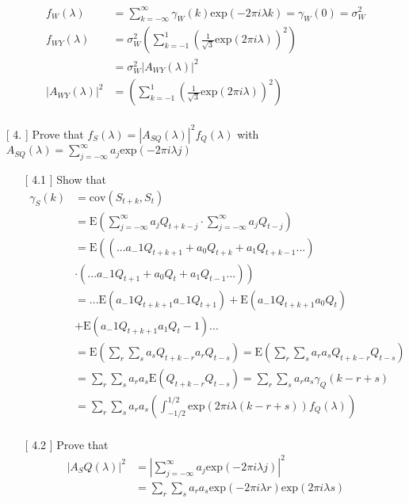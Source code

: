 \documentclass[10pt,a4paper]{article}
\begin{document}
\begin{enumerate}
\begin{enumerate}
		\begin{align*}
			f_W(\lambda) &= \sum_{k=-\infty}^{\infty} \gamma_{W}(k) \text{exp}(-2\pi i \lambda k) = \gamma_{W}(0) = \sigma_{W}^2\\
			f_{WY}(\lambda)&= \sigma_{W}^2 \left( \sum_{k=-1}^{1}(\frac{1}{\sqrt{3}}\text{exp}(2\pi i \lambda))^2\right) \\
			&= \sigma_{W}^2 |A_{WY}(\lambda)|^2 \\
			|A_{WY}(\lambda)|^2 &= \left( \sum_{k=-1}^{1}(\frac{1}{\sqrt{3}}\text{exp}(2\pi i \lambda))^2\right) \\
		\end{align*}
		\end{enumerate}
	\item[[ 4.]] Prove that $f_S(\lambda) = |A_{SQ}(\lambda)|^2 f_Q(\lambda)$ with $A_{SQ}(\lambda) = \sum_{j=-\infty}^{\infty}a_j \text{exp}(-2\pi i \lambda j)$
		\begin{enumerate}
		\item[[ 4.1]] Show that 
		\begin{align*}
			\gamma_{S}(k) &= \text{cov}(S_{t+k},S_t) \\
			&= \text{E}(\sum_{j=-\infty}^{\infty}a_j Q_{t+k-j} \cdot \sum_{j=-\infty}^{\infty}a_j Q_{t-j} ) \\
			&= \text{E} \left( (...a_-1 Q_{t+k+1} + a_0 Q_{t+k} + a_1 Q_{t+k-1} ...) \right. \\
			&\cdot (...a_-1 Q_{t+1} + a_0 Q_t + a_1 Q_{t-1} ...) \left. \right) \\
			&= ... \text{E}(a_-1 Q_{t+k+1} a_-1 Q_{t+1}) + \text{E}(a_-1 Q_{t+k+1} a_0 Q_t) \\
			&+ \text{E}(a_-1 Q_{t+k+1} a_1 Q_t-1)... \\
			&= \text{E}(\sum_{r} \sum_{s} a_s Q_{t+k-r} a_r Q_{t-s}) = \text{E}(\sum_{r} \sum_{s} a_r a_s Q_{t+k-r} Q_{t-s}) \\
			&= \sum_{r} \sum_{s} a_r a_s \text{E}(Q_{t+k-r} Q_{t-s}) = \sum_{r} \sum_{s} a_r a_s \gamma_Q (k-r+s) \\
			&= \sum_{r} \sum_{s} a_r a_s \left( \int_{-1/2}^{1/2} \text{exp}(2\pi i \lambda (k-r+s)) f_Q(\lambda)  \right) \\
		\end{align*}
		\item[[ 4.2]] Prove that
		\begin{align*}
			|A_SQ(\lambda)|^2 &= |\sum_{j=-\infty}^{\infty}a_j \text{exp}(-2\pi i \lambda j)|^2 \\
			&= \sum_{r} \sum_{s} a_r a_s  \text{exp}(-2\pi i \lambda r) \text{exp}(2\pi i \lambda s) \\

\end{align*}
\end{enumerate}
\end{enumerate}
\end{document}
